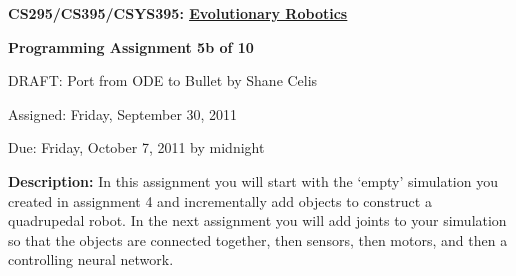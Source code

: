 \documentclass[12pt]{article}
\begin{document}
\centerline{\bf \Large CS295/CS395/CSYS395: \href{CS295_395_Syllabus.pdf}{\underline{Evolutionary Robotics}}}

\vspace{0.5cm}

\centerline{\bf \large Programming Assignment 5b of 10}
\vspace{0.25cm} \centerline{\color{red}DRAFT: Port from ODE to Bullet by Shane Celis \color{black}}

\vspace{0.5cm}

\centerline{\large Assigned: Friday, September 30, 2011}

\vspace{0.5cm}

\centerline{\large Due: Friday, October 7, 2011 by midnight}

\vspace{0.5cm}

\noindent \textbf{Description:} In this assignment you will start with the `empty' simulation you created in assignment 4 and incrementally add objects to construct a quadrupedal robot. In the next assignment you will add joints to your simulation so that the objects are connected together, then sensors, then motors, and then a controlling neural network.
\end{document}
